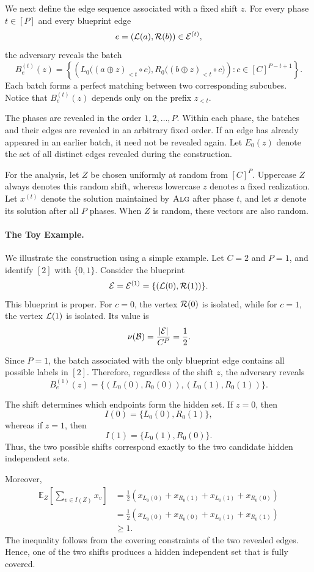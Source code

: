 We next define the edge sequence associated with a fixed shift $z$. For every phase $t\in[P]$ and every blueprint edge
$$
e=(\mathcal{L}(a),\mathcal{R}(b))\in\mathcal{E}^{(t)},
$$
the adversary reveals the batch
$$
B_e^{(t)}(z)
=
\left\{
\left(
L_0\bigl((a\oplus z)_{<t}\circ c\bigr),
R_0\bigl((b\oplus z)_{<t}\circ c\bigr)
\right)
:
c\in[C]^{P-t+1}
\right\}.
$$
Each batch forms a perfect matching between two corresponding subcubes. Notice that $B_e^{(t)}(z)$ depends only on the prefix $z_{<t}$.

The phases are revealed in the order $1,2,\ldots,P$. Within each phase, the batches and their edges are revealed in an arbitrary fixed order. If an edge has already appeared in an earlier batch, it need not be revealed again. Let $E_0(z)$ denote the set of all distinct edges revealed during the construction.

For the analysis, let $Z$ be chosen uniformly at random from $[C]^P$. Uppercase $Z$ always denotes this random shift, whereas lowercase $z$ denotes a fixed realization. Let $x^{(t)}$ denote the solution maintained by $\textsc{Alg}$ after phase $t$, and let $x$ denote its solution after all $P$ phases. When $Z$ is random, these vectors are also random.

\paragraph{The Toy Example.}
We illustrate the construction using a simple example. Let $C=2$ and $P=1$, and identify $[2]$ with $\{0,1\}$. Consider the blueprint
$$
\mathcal{E}=\mathcal{E}^{(1)}=\{(\mathcal{L}(0),\mathcal{R}(1))\}.
$$
This blueprint is proper. For $c=0$, the vertex $\mathcal{R}(0)$ is isolated, while for $c=1$, the vertex $\mathcal{L}(1)$ is isolated. Its value is
$$
\nu(\mathcal{B})
=
\frac{|\mathcal{E}|}{C^P}
=
\frac{1}{2}.
$$

Since $P=1$, the batch associated with the only blueprint edge contains all possible labels in $[2]$. Therefore, regardless of the shift $z$, the adversary reveals
$$
B_e^{(1)}(z)
=
\{(L_0(0),R_0(0)),(L_0(1),R_0(1))\}.
$$

The shift determines which endpoints form the hidden set. If $z=0$, then
$$
I(0)=\{L_0(0),R_0(1)\},
$$
whereas if $z=1$, then
$$
I(1)=\{L_0(1),R_0(0)\}.
$$
Thus, the two possible shifts correspond exactly to the two candidate hidden independent sets.

Moreover,
$$
\begin{aligned}
\mathbb{E}_Z
\left[
\sum_{v\in I(Z)}x_v
\right]
&=
\frac{1}{2}
\left(
x_{L_0(0)}
+x_{R_0(1)}
+x_{L_0(1)}
+x_{R_0(0)}
\right) \\
&=
\frac{1}{2}
\left(
x_{L_0(0)}
+x_{R_0(0)}
+x_{L_0(1)}
+x_{R_0(1)}
\right) \\
&\geq 1.
\end{aligned}
$$
The inequality follows from the covering constraints of the two revealed edges. Hence, one of the two shifts produces a hidden independent set that is fully covered.

